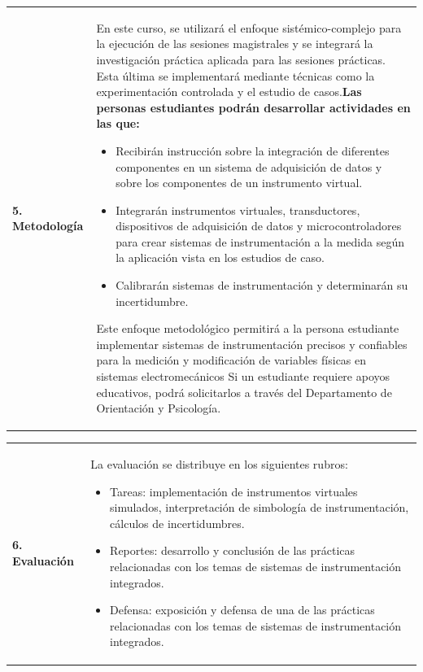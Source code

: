 \documentclass[letterpaper]{article}%
\begin{document}
\begin{tabularx}{\textwidth}{p{3cm}p{13cm}}%
\par\fontsize{12}{14}\selectfont \textbf{\textcolor{parte}{5. Metodología}}&En este curso, se utilizará el enfoque sistémico-complejo para la ejecución de las sesiones magistrales y se integrará la investigación práctica aplicada para las sesiones prácticas. Esta última se implementará mediante técnicas como la experimentación controlada y el estudio de casos.\newline\newline \textbf{Las personas estudiantes podrán desarrollar actividades en las que:} \newline\begin{itemize}\item Recibirán instrucción sobre la integración de diferentes componentes en un sistema de adquisición de datos y sobre los componentes de un instrumento virtual.\item Integrarán instrumentos virtuales, transductores, dispositivos de adquisición de datos y microcontroladores para crear sistemas de instrumentación a la medida según la aplicación vista en los estudios de caso.\item Calibrarán sistemas de instrumentación y determinarán su incertidumbre.\end{itemize}\vspace*{2mm}Este enfoque metodológico permitirá a la persona estudiante implementar sistemas de instrumentación precisos y confiables para la medición y modificación de variables físicas en sistemas electromecánicos\vspace*{2mm} \newline  Si un estudiante requiere apoyos educativos, podrá solicitarlos a través del Departamento de Orientación y Psicología. \newline \\%
\end{tabularx}%
\vspace*{2mm}%
\newline%
\begin{tabularx}{\textwidth}{p{3cm}p{13cm}}%
\par\fontsize{12}{14}\selectfont \textbf{\textcolor{parte}{6. Evaluación}}&La evaluación se distribuye en los siguientes rubros: \newline \begin{itemize} \item Tareas: implementación de instrumentos virtuales simulados, interpretación de simbología de instrumentación, cálculos de incertidumbres. \item Reportes: desarrollo y conclusión de las prácticas relacionadas con los temas de sistemas de instrumentación integrados. \item Defensa: exposición y defensa de una de las prácticas relacionadas con los temas de sistemas de instrumentación integrados. \end{itemize}\\%
\end{tabularx}%
\end{document}
